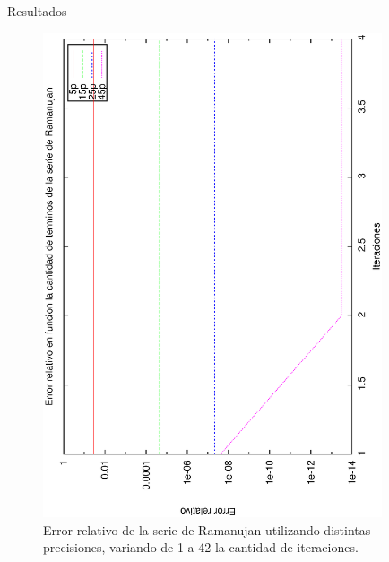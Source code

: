 \begin{section}{Resultados}
	\VSP

	\begin{figure}[H]
	  \centering
		\includegraphics[width=10cm,angle=-90]{graficos/ramanujan_1a42it.eps}
	  \caption{Error relativo de la serie de Ramanujan utilizando distintas precisiones, variando de 1 a 42 la cantidad de iteraciones.}
	  \label{fig:ramanujan_42it}
	\end{figure}
	
	\VSP	


\end{section}
